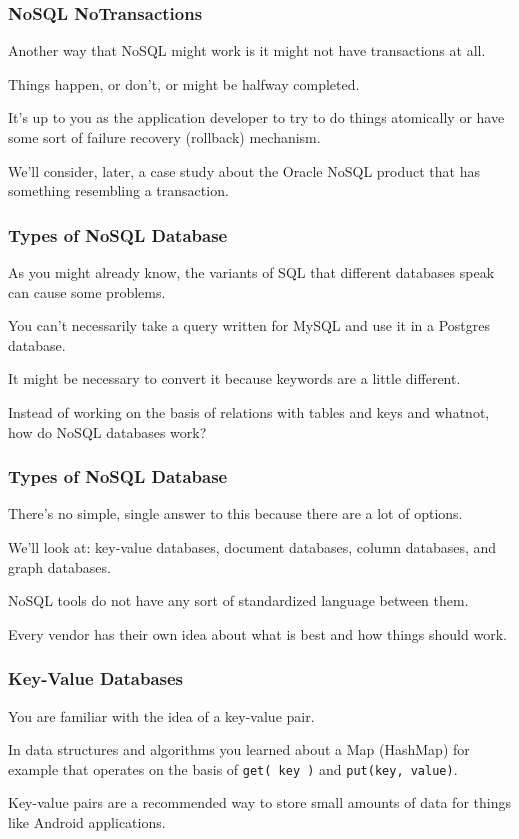\begin{frame}
\frametitle{NoSQL NoTransactions}

Another way that NoSQL might work is it might not have transactions at all. 

Things happen, or don't, or might be halfway completed. 

It's up to you as the application developer to try to do things atomically or have some sort of failure recovery (rollback) mechanism. 

We'll consider, later, a case study about the Oracle NoSQL product that has something resembling a transaction.


\end{frame}



\begin{frame}
\frametitle{Types of NoSQL Database}

As you might already know, the variants of SQL that different databases speak can cause some problems.

You can't necessarily take a query written for MySQL and use it in a Postgres database. 

It might be necessary to convert it because keywords are a little different.

Instead of working on the basis of relations with tables and keys and whatnot, how do NoSQL databases work?


\end{frame}


\begin{frame}
\frametitle{Types of NoSQL Database}

There's no simple, single answer to this because there are a lot of options. 

We'll look at: key-value databases, document databases, column databases, and graph databases.

NoSQL tools do not have any sort of standardized language between them.

Every vendor has their own idea about what is best and how things should work. 


\end{frame}



\begin{frame}
\frametitle{Key-Value Databases}

You are familiar with the idea of a key-value pair. 

In data structures and algorithms you learned about a Map (HashMap) for example that operates on the basis of \texttt{get( key )} and \texttt{put(key, value)}. 

Key-value pairs are a recommended way to store small amounts of data for things like Android applications. 

\end{frame}



